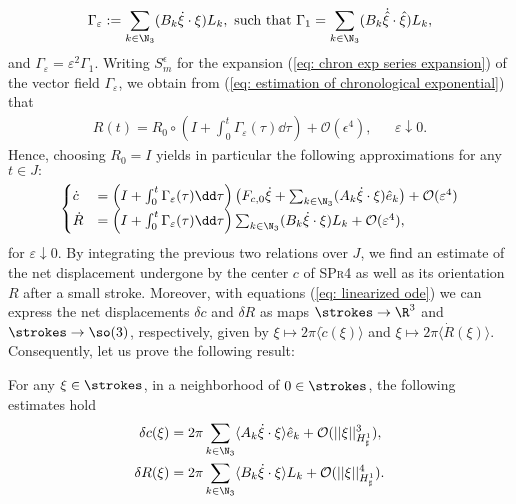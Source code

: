 \begin{equation}
\Gamma_\varepsilon := \sum_{k \in \N_3}(B_k \dot{\xi} \cdot \xi) L_k, \text{ such that } \Gamma_1 = \sum_{k \in \N_3}(B_k \dot{\hat{\xi}} \cdot \hat{\xi}) L_k,
\end{equation}
and  $\Gamma_\varepsilon = \varepsilon^2 \Gamma_1$. Writing $S_{m}^{\epsilon}$ for the expansion (\ref{eq: chron exp series expansion}) of the vector field $\Gamma_\varepsilon$, we obtain from (\ref{eq: estimation of chronological exponential}) that
\begin{align}
	R(t) = R_0 \circ \left ( I + \int_{0}^{t} \Gamma_\varepsilon(\tau) \dd\tau \right ) + \mathcal{O}(\epsilon^4), & & \varepsilon \downarrow 0.
\end{align}
Hence, choosing $R_0 = I$ yields in particular the following approximations for any $t \in J:$
\begin{align}
\label{eq: linearized ode}
\begin{cases}
\dot{c} &= \left ( I + \int_{0}^{t} \Gamma_\varepsilon(\tau) \dd\tau \right ) \left ( F_{c,0} \dot{\xi} + \sum_{k \in \N_3} (A_k \dot{\xi} \cdot \xi) \hat{e}_k \right )  + \mathcal{O}(\varepsilon^4)\\
\dot{R} &= \left ( I + \int_{0}^{t} \Gamma_\varepsilon(\tau) \dd\tau \right ) \sum_{k \in \N_3}(B_k \dot{\xi} \cdot \xi) L_k + \mathcal{O}(\varepsilon^4),
\end{cases}
\end{align}
for $\varepsilon\downarrow 0$. By integrating the previous two relations over $J$, we find an estimate of the net displacement undergone by the center $c$ of \textsc{SPr4} as well as its orientation $R$ after a small stroke. Moreover, with equations (\ref{eq: linearized ode}) we can express the net displacements $\delta c$ and $\delta R$ as maps $\strokes \to \R^3$ and $\strokes \to \so(3)$, respectively, given by $\xi \mapsto 2 \pi \langle \dot{c}(\xi) \rangle $ and $\xi \mapsto 2 \pi \langle \dot{R}(\xi) \rangle$. Consequently, let us prove the following result:

\begin{proposition}
\label{prop:net displacement}
For any $\xi \in \strokes$, in a neighborhood of $0 \in \strokes$, the following estimates hold
\begin{equation}
\label{eq:net displacement expansion}
\begin{aligned}
\delta c(\xi) &= 2 \pi \sum_{k \in \N_3} \langle A_k \dot{\xi} \cdot \xi \rangle \hat{e}_k + \mathcal{O}(||\xi||_{H^1_{\sharp}}^3),\\
\delta R(\xi) &= 2 \pi \sum_{k \in \N_3} \langle B_k \dot{\xi} \cdot \xi \rangle L_k + \mathcal{O}(||\xi||^4_{H_\sharp^1}).
\end{aligned}
\end{equation}
\end{proposition}

